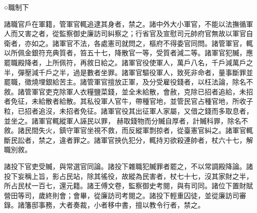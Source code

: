 
\begin{pinyinscope}

 ○職制下



 諸職官戶在軍籍，管軍官輒追逮其身者，禁之。諸中外大小軍官，不能以法撫循軍人而又害之者，從監察御史廉訪司糾察之；行省官及宣慰司元帥府官無故以軍官自衛者，亦如之。諸軍官不法，各處憲司就問之，樞府不得委官同問。諸管軍官，輒以所佩金銀符充典質者，笞五十七，降散官一等，受質者減二等。諸軍官犯贓，應罷職殿降者，上所佩符，再敘日給之。諸軍官役使軍人，萬戶八名，千戶減萬戶之半，彈壓減千戶之半，過是數者坐罪。諸軍官驅役軍人，致死非命者，量事斷罪並罷職，徵燒埋銀給苦主。諸管軍官擅放正軍，及分受雇役錢者，以枉法論，除名不敘。諸管軍官吏克除軍人衣糧鹽菜錢，並全未給散，會赦，克除已招者追給，未招者免征，未給散者給散。其私役軍人官牛，帶種官地，並管民官占種官地，所收子粒，已招者追沒，未招者免征。諸軍官役其出征軍人家屬，又借之錢而多取息者，並坐之。諸軍官輒縱軍人誣民以罪，赫取錢物而分贓自厚者，計贓科罪，除名不敘。諸民間失火，鎮守軍官坐視不救，而反縱軍剽掠者，從臺憲官糾之。諸軍官輒斷民訟者，禁之，違者罪之。諸軍官挾仇犯分，輒持刃欲殺連帥者，杖六十七，解職別敘。



 諸投下官吏受贓，與常選官同論。諸投下雜職犯贓罪者罷之，不以常調殿降論。諸投下妄稱上旨，影占民站，除其徭役，故縱為民害者，杖七十七，沒其家財之半，所占民杖一百七，還元籍。諸王傅文卷，監察御史考閱，與有司同。諸位下置財賦營田等司，歲終則會；會畢，從廉訪司考閱之。諸投下輕重囚徒，並從廉訪司審錄。諸籓邸事務，大者奏裁，小者移中書，擅以教令行者，禁之。




\end{pinyinscope}
